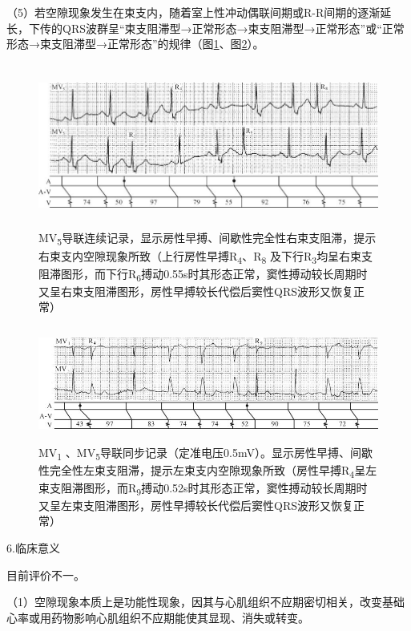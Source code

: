 （5）若空隙现象发生在束支内，随着室上性冲动偶联间期或R-R间期的逐渐延长，下传的QRS波群呈“束支阻滞型→正常形态→束支阻滞型→正常形态”或“正常形态→束支阻滞型→正常形态”的规律（图\ref{fig28-12}、图\ref{fig28-13}）。

\begin{figure}[!htbp]
 \centering
 \includegraphics[width=5.79167in,height=2.125in]{./images/Image00473.jpg}
 \captionsetup{justification=centering}
 \caption{MV\textsubscript{5}导联连续记录，显示房性早搏、间歇性完全性右束支阻滞，提示右束支内空隙现象所致（上行房性早搏R\textsubscript{4}、R\textsubscript{8} 及下行R\textsubscript{3}均呈右束支阻滞图形，而下行R\textsubscript{6}搏动0.55s时其形态正常，窦性搏动较长周期时又呈右束支阻滞图形，房性早搏较长代偿后窦性QRS波形又恢复正常）}
 \label{fig28-12}
  \end{figure} 


\begin{figure}[!htbp]
 \centering
 \includegraphics[width=5.55208in,height=1.48958in]{./images/Image00474.jpg}
 \captionsetup{justification=centering}
 \caption{MV\textsubscript{1} 、MV\textsubscript{5}导联同步记录（定准电压0.5mV）。显示房性早搏、间歇性完全性左束支阻滞，提示左束支内空隙现象所致（房性早搏R\textsubscript{4}呈左束支阻滞图形，而R\textsubscript{9}搏动0.52s时其形态正常，窦性搏动较长周期时又呈左束支阻滞图形，房性早搏较长代偿后窦性QRS波形又恢复正常）}
 \label{fig28-13}
  \end{figure} 


6.临床意义

目前评价不一。

（1）空隙现象本质上是功能性现象，因其与心肌组织不应期密切相关，改变基础心率或用药物影响心肌组织不应期能使其显现、消失或转变。


